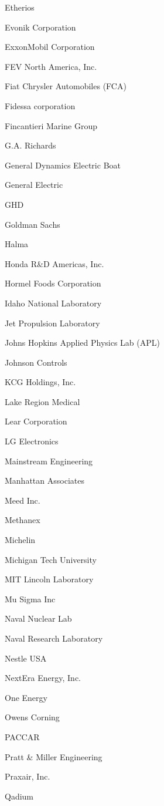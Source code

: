 \documentclass[twoside]{article}
\begin{document}
\begin{center}
\begin{multicols}{5}
\begin{FlushLeft}
\begin{compactitem}
\item Etherios
\item Evonik Corporation
\item ExxonMobil Corporation
\item FEV North America, Inc.
\item Fiat Chrysler Automobiles (FCA)
\item Fidessa corporation
\item Fincantieri Marine Group
\item G.A. Richards
\item General Dynamics Electric Boat
\item General Electric
\item GHD
\item Goldman Sachs
\item Halma
\item Honda R\&D Americas, Inc.
\item Hormel Foods Corporation
\item Idaho National Laboratory
\item Jet Propulsion Laboratory
\item Johns Hopkins Applied Physics Lab (APL)
\item Johnson Controls
\item KCG Holdings, Inc.
\item Lake Region Medical
\item Lear Corporation
\item LG Electronics
\item Mainstream Engineering
\item Manhattan Associates
\item Meed Inc.
\item Methanex
\item Michelin
\item Michigan Tech University
\item MIT Lincoln Laboratory
\item Mu Sigma Inc
\item Naval Nuclear Lab
\item Naval Research Laboratory
\item Nestle USA
\item NextEra Energy, Inc.
\item One Energy
\item Owens Corning
\item PACCAR
\item Pratt \& Miller Engineering
\item Praxair, Inc.
\item Qadium

\end{compactitem}
\end{FlushLeft}
\end{multicols}
\end{center}
\end{document}
